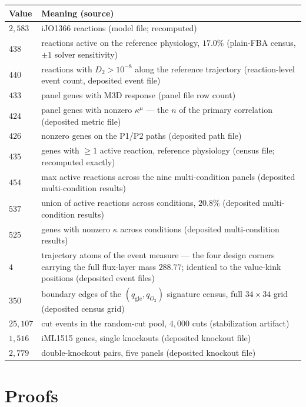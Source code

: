 \documentclass[11pt,a4paper]{article}
\theoremstyle{plain}
\theoremstyle{definition}
\theoremstyle{remark}
\newcommand{\kmu}{\kappa^{\mu}}
\begin{document}
\noindent\begin{minipage}{\textwidth}\footnotesize
\begin{tabularx}{\textwidth}{@{}l>{\raggedright\arraybackslash}X@{}}
\toprule
\textbf{Value} & \textbf{Meaning (source)} \\
\midrule
$2{,}583$ & iJO1366 reactions (model file; recomputed) \\
$438$ & reactions active on the reference physiology, $17.0\%$ (plain-FBA census, $\pm 1$ solver sensitivity) \\
$440$ & reactions with $D_2 > 10^{-8}$ along the reference trajectory (reaction-level event count, deposited event file) \\
$433$ & panel genes with M3D response (panel file row count) \\
$424$ & panel genes with nonzero $\kmu$ --- the $n$ of the primary correlation (deposited metric file) \\
$426$ & nonzero genes on the P1/P2 paths (deposited path file) \\
$435$ & genes with $\ge 1$ active reaction, reference physiology (census file; recomputed exactly) \\
$454$ & max active reactions across the nine multi-condition panels (deposited multi-condition results) \\
$537$ & union of active reactions across conditions, $20.8\%$ (deposited multi-condition results) \\
$525$ & genes with nonzero $\kappa$ across conditions (deposited multi-condition results) \\
$4$ & trajectory atoms of the event measure --- the four design corners carrying the full flux-layer mass $288.77$; identical to the value-kink positions (deposited event files) \\
$350$ & boundary edges of the $(q_{\mathrm{glc}}, q_{O_2})$ signature census, full $34\times34$ grid (deposited census grid) \\
$25{,}107$ & cut events in the random-cut pool, $4{,}000$ cuts (stabilization artifact) \\
$1{,}516$ & iML1515 genes, single knockouts (deposited knockout file) \\
$2{,}779$ & double-knockout pairs, five panels (deposited knockout file) \\
\bottomrule
\end{tabularx}
\end{minipage}

\section{Proofs}\label{sec:proofs}
\end{document}
